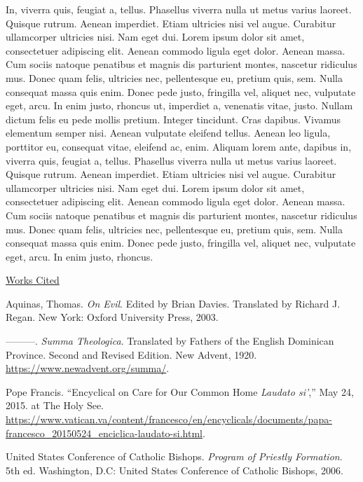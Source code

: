 \documentclass[
    12pt,
    letterpaper,
    oneside,
    noraggedright
]{turabian-researchpaper}
\newlength{\cslhangindent}
\newenvironment{CSLReferences}[2]
 {
\newpage %
\centerline{\underline{Works Cited}} %
 \setlength{\parindent}{0pt}
 \singlespacing
  \let\oldpar\par
  \def\par{\hangindent=\cslhangindent\oldpar}
  \setlength{\parskip}{1em}
 }
{
}
\begin{document}
In, viverra quis, feugiat a, tellus. Phasellus viverra nulla ut metus
varius laoreet. Quisque rutrum. Aenean imperdiet. Etiam ultricies nisi
vel augue. Curabitur ullamcorper ultricies nisi. Nam eget dui. Lorem
ipsum dolor sit amet, consectetuer adipiscing elit. Aenean commodo
ligula eget dolor. Aenean massa. Cum sociis natoque penatibus et magnis
dis parturient montes, nascetur ridiculus mus. Donec quam felis,
ultricies nec, pellentesque eu, pretium quis, sem. Nulla consequat massa
quis enim. Donec pede justo, fringilla vel, aliquet nec, vulputate eget,
arcu. In enim justo, rhoncus ut, imperdiet a, venenatis vitae, justo.
Nullam dictum felis eu pede mollis pretium. Integer tincidunt. Cras
dapibus. Vivamus elementum semper nisi. Aenean vulputate eleifend
tellus. Aenean leo ligula, porttitor eu, consequat vitae, eleifend ac,
enim. Aliquam lorem ante, dapibus in, viverra quis, feugiat a, tellus.
Phasellus viverra nulla ut metus varius laoreet. Quisque rutrum. Aenean
imperdiet. Etiam ultricies nisi vel augue. Curabitur ullamcorper
ultricies nisi. Nam eget dui. Lorem ipsum dolor sit amet, consectetuer
adipiscing elit. Aenean commodo ligula eget dolor. Aenean massa. Cum
sociis natoque penatibus et magnis dis parturient montes, nascetur
ridiculus mus. Donec quam felis, ultricies nec, pellentesque eu, pretium
quis, sem. Nulla consequat massa quis enim. Donec pede justo, fringilla
vel, aliquet nec, vulputate eget, arcu. In enim justo, rhoncus.

\hypertarget{refs}{}
\begin{CSLReferences}{1}{0}
\leavevmode{}%
Aquinas, Thomas. \emph{On Evil}. Edited by Brian Davies. Translated by
Richard J. Regan. New York: Oxford University Press, 2003.

\leavevmode{}%
---------. \emph{Summa Theologica}. Translated by Fathers of the English
Dominican Province. Second and Revised Edition. New Advent, 1920.
\url{https://www.newadvent.org/summa/}.

\leavevmode{}%
Pope Francis. {``Encyclical on Care for Our Common Home \emph{Laudato
si'},''} May 24, 2015. at The Holy See.
\url{https://www.vatican.va/content/francesco/en/encyclicals/documents/papa-francesco_20150524_enciclica-laudato-si.html}.

\leavevmode{}%
United States Conference of Catholic Bishops. \emph{Program of Priestly
Formation}. 5th ed. Washington, D.C: United States Conference of
Catholic Bishops, 2006.

\end{CSLReferences}
\end{document}
